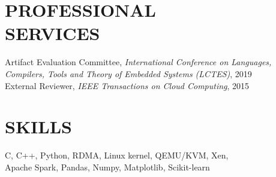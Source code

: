 \documentclass[margin]{res}
\begin{document}
\begin{resume}
\section{PROFESSIONAL \\ SERVICES}
\par
Artifact Evaluation Committee, \textit{International Conference on Languages, Compilers, Tools and Theory of Embedded Systems (LCTES)}, 2019 \\

\vspace{-1.8em}
External Reviewer, \textit{IEEE Transactions on Cloud Computing}, 2015 \\

\vspace{-1.5em}
\section{SKILLS}
\par
C, C++, Python, RDMA, Linux kernel, QEMU/KVM, Xen, \\
Apache Spark, Pandas, Numpy, Matplotlib, Scikit-learn

\end{resume}
\end{document}
